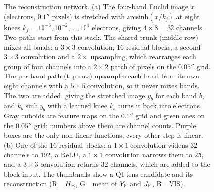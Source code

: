 \begin{figure}
\caption{The reconstruction network.
(a) The four-band Euclid image $x$ (electrons, $0.1''$ pixels) is stretched with $\mathrm{arcsinh}(x/k_j)$ at eight knees $k_j = 10^{-3}, 10^{-2}, \ldots, 10^{4}$ electrons, giving $4\times8=32$ channels.
Two paths start from this stack.
The shared trunk (middle row) mixes all bands: a $3\times3$ convolution, $16$ residual blocks, a second $3\times3$ convolution and a $2\times$ upsampling, which rearranges each group of four channels into a $2\times2$ patch of pixels on the $0.05''$ grid.
The per-band path (top row) upsamples each band from its own eight channels with a $5\times5$ convolution, so it never mixes bands.
The two are added, giving the stretched image $y_b$ for each band $b$, and $k_b \sinh y_b$ with a learned knee $k_b$ turns it back into electrons.
Gray cuboids are feature maps on the $0.1''$ grid and green ones on the $0.05''$ grid; numbers above them are channel counts.
Purple boxes are the only non-linear functions; every other step is linear.
(b) One of the $16$ residual blocks: a $1\times1$ convolution widens $32$ channels to $192$, a ReLU, a $1\times1$ convolution narrows them to $25$, and a $3\times3$ convolution returns $32$ channels, which are added to the block input.
The thumbnails show a Q1 lens candidate and its reconstruction (R\,=\,$H_{\rm E}$, G\,=\,mean of $Y_{\rm E}$ and $J_{\rm E}$, B\,=\,VIS).}
\label{fig:architecture}
\end{figure}

